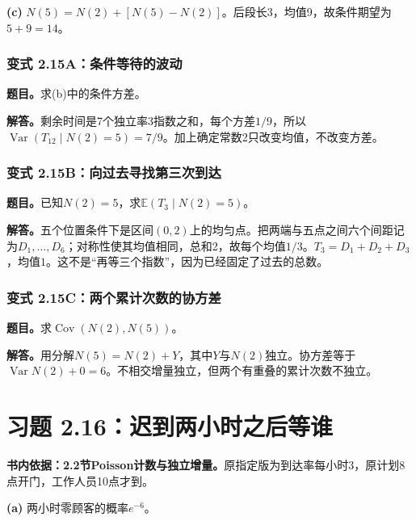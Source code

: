 \documentclass[12pt,a4paper,UTF8,fontset=fandol]{ctexart}
\begin{document}
\textbf{(c)}
\(N(5)=N(2)+[N(5)-N(2)]\)。后段长3，均值9，故条件期望为\(\boxed{5+9=14}\)。

\subsubsection{变式
2.15A：条件等待的波动}\label{ux53d8ux5f0f-2.15aux6761ux4ef6ux7b49ux5f85ux7684ux6ce2ux52a8}

\textbf{题目。}求(b)中的条件方差。

\textbf{解答。}剩余时间是7个独立率3指数之和，每个方差\(1/9\)，所以\(\operatorname{Var}(T_{12}\mid N(2)=5)=7/9\)。加上确定常数2只改变均值，不改变方差。

\subsubsection{变式
2.15B：向过去寻找第三次到达}\label{ux53d8ux5f0f-2.15bux5411ux8fc7ux53bbux5bfbux627eux7b2cux4e09ux6b21ux5230ux8fbe}

\textbf{题目。}已知\(N(2)=5\)，求\(\mathbb E(T_3\mid N(2)=5)\)。

\textbf{解答。}五个位置条件下是区间\((0,2)\)上的均匀点。把两端与五点之间六个间距记为\(D_1,\ldots,D_6\)；对称性使其均值相同，总和2，故每个均值\(1/3\)。\(T_3=D_1+D_2+D_3\)，均值\(1\)。这不是``再等三个指数''，因为已经固定了过去的总数。

\subsubsection{变式
2.15C：两个累计次数的协方差}\label{ux53d8ux5f0f-2.15cux4e24ux4e2aux7d2fux8ba1ux6b21ux6570ux7684ux534fux65b9ux5dee}

\textbf{题目。}求\(\operatorname{Cov}(N(2),N(5))\)。

\textbf{解答。}用分解\(N(5)=N(2)+Y\)，其中\(Y\)与\(N(2)\)独立。协方差等于\(\operatorname{Var}N(2)+0=6\)。不相交增量独立，但两个有重叠的累计次数不独立。

\section{习题
2.16：迟到两小时之后等谁}\label{ux4e60ux9898-2.16ux8fdfux5230ux4e24ux5c0fux65f6ux4e4bux540eux7b49ux8c01}

\textbf{书内依据：2.2节Poisson计数与独立增量。}原指定版为到达率每小时3，原计划8点开门，工作人员10点才到。

\textbf{(a)} 两小时零顾客的概率\(\boxed{e^{-6}}\)。
\end{document}
